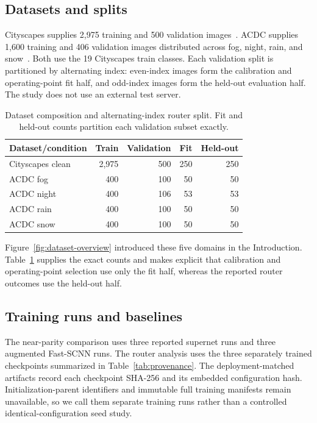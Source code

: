 \documentclass[a4paper,review,12pt]{elsarticle}
\begin{document}
\subsection{Datasets and splits}

Cityscapes supplies 2,975 training and 500 validation images~\cite{cordts2016cityscapes}. ACDC supplies 1,600 training and 406 validation images distributed across fog, night, rain, and snow~\cite{sakaridis2021acdc}. Both use the 19 Cityscapes train classes. Each validation split is partitioned by alternating index: even-index images form the calibration and operating-point fit half, and odd-index images form the held-out evaluation half. The study does not use an external test server.

\begin{table}[H]
\centering
\caption{Dataset composition and alternating-index router split. Fit and held-out counts partition each validation subset exactly.}
\label{tab:dataset-splits}
\small
\begin{tabular}{@{}lrrrr@{}}
\toprule
Dataset/condition & Train & Validation & Fit & Held-out \\
\midrule
Cityscapes clean & 2,975 & 500 & 250 & 250 \\
ACDC fog   & 400 & 100 & 50 & 50 \\
ACDC night & 400 & 106 & 53 & 53 \\
ACDC rain  & 400 & 100 & 50 & 50 \\
ACDC snow  & 400 & 100 & 50 & 50 \\
\bottomrule
\end{tabular}
\end{table}

Figure~\ref{fig:dataset-overview} introduced these five domains in the Introduction. Table~\ref{tab:dataset-splits} supplies the exact counts and makes explicit that calibration and operating-point selection use only the fit half, whereas the reported router outcomes use the held-out half.

\subsection{Training runs and baselines}

The near-parity comparison uses three reported supernet runs and three augmented Fast-SCNN runs. The router analysis uses the three separately trained checkpoints summarized in Table~\ref{tab:provenance}. The deployment-matched artifacts record each checkpoint SHA-256 and its embedded configuration hash. Initialization-parent identifiers and immutable full training manifests remain unavailable, so we call them separate training runs rather than a controlled identical-configuration seed study.
\end{document}
